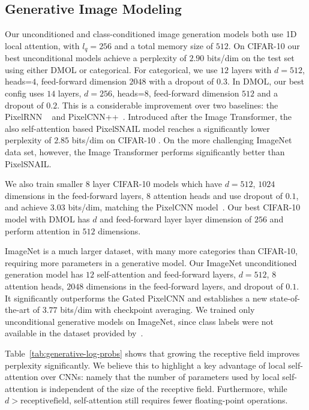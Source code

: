 \documentclass{article}
\newcommand{\modeldim}{d}
\begin{document}
\subsection{Generative Image Modeling}
Our unconditioned and class-conditioned image generation models both use 1D local attention, with $l_q=256$ and a total memory size of $512$.
On CIFAR-10 our best unconditional models achieve a perplexity of $2.90$ bits/dim on the test set using either DMOL or categorical. For categorical, we use $12$ layers with $\modeldim=512$, heads=$4$, feed-forward dimension $2048$ with a dropout of $0.3$. In DMOL, our best config uses $14$ layers, $\modeldim=256$, heads=$8$, feed-forward dimension $512$ and a dropout of $0.2$. This is a considerable improvement over two baselines: the PixelRNN ~\cite{PixelRNN} and PixelCNN++~\cite{PixelCNNpp}. Introduced after the Image Transformer, the also self-attention based PixelSNAIL model reaches a significantly lower perplexity of $2.85$ bits/dim on CIFAR-10 \cite{chen2017pixelsnail}. On the more challenging ImageNet data set, however, the Image Transformer performs significantly better than PixelSNAIL.


We also train smaller $8$ layer CIFAR-10 models which have $\modeldim=512$, $1024$ dimensions in the feed-forward layers, $8$ attention heads and use dropout of $0.1$, and achieve $3.03$ bits/dim, matching the PixelCNN model~\cite{PixelRNN}. Our best CIFAR-10 model with DMOL has $\modeldim$ and feed-forward layer layer dimension of $256$ and perform attention in $512$ dimensions.

ImageNet is a much larger dataset, with many more categories than CIFAR-10, requiring more parameters in a generative model. Our ImageNet unconditioned generation model has $12$ self-attention and feed-forward layers, $\modeldim=512$, $8$ attention heads, $2048$ dimensions in the feed-forward layers, and dropout of $0.1$. It significantly outperforms the Gated PixelCNN and establishes a new state-of-the-art of $3.77$ bits/dim with checkpoint averaging. We trained only unconditional generative models on ImageNet, since class labels were not available in the dataset provided by~\cite{PixelRNN}.

Table~\ref{tab:generative-log-probs} shows that growing the receptive field improves perplexity significantly. We believe this to highlight a key advantage of local self-attention over CNNs: namely that the number of parameters used by local self-attention is independent of the size of the receptive field. Furthermore, while $\modeldim > \mathrm{receptive field}$, self-attention still requires fewer floating-point operations.
\end{document}
